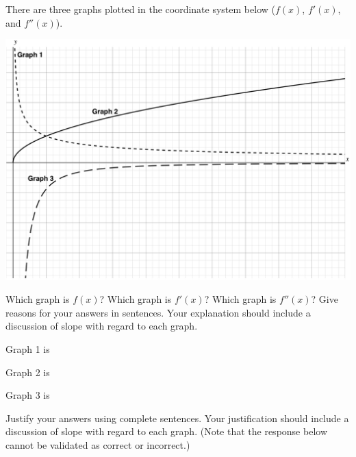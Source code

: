 \documentclass[handout]{ximera}
\begin{document}
\begin{problem}
There are three graphs plotted in the coordinate system below ($f(x)$, $f'(x)$, and $f''(x)$). 


\includegraphics[scale=.18]{SVA-label.png}


Which graph is $f(x)$? Which graph is $f'(x)$? Which graph is $f''(x)$? Give reasons for your answers in sentences. Your explanation should include a discussion of slope with regard to each graph.

\begin{question}
Graph 1 is
\begin{multipleChoice}
\end{multipleChoice}
\end{question}

\begin{question}
Graph 2 is
\begin{multipleChoice}
\end{multipleChoice}
\end{question}

\begin{question}
Graph 3 is
\begin{multipleChoice}
\end{multipleChoice}
\end{question}


Justify your answers using complete sentences. Your justification should include a discussion of slope with regard to each graph. (Note that the response below cannot be validated as correct or incorrect.)
\begin{freeResponse}
\end{freeResponse}
\end{problem}
\end{document}
